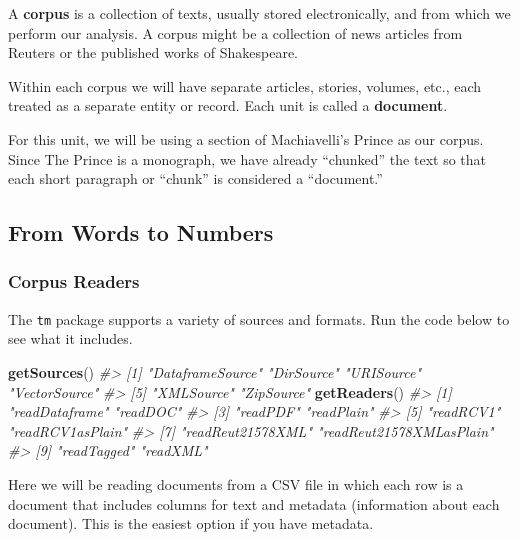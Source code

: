 \documentclass[
]{book}
\newenvironment{Shaded}{\begin{snugshade}}{\end{snugshade}}
\newcommand{\CommentTok}[1]{\textcolor[rgb]{0.56,0.35,0.01}{\textit{#1}}}
\newcommand{\KeywordTok}[1]{\textcolor[rgb]{0.13,0.29,0.53}{\textbf{#1}}}
\newcommand{\NormalTok}[1]{#1}
\begin{document}
A \textbf{corpus} is a collection of texts, usually stored electronically, and from which we perform our analysis. A corpus might be a collection of news articles from Reuters or the published works of Shakespeare.

Within each corpus we will have separate articles, stories, volumes, etc., each treated as a separate entity or record. Each unit is called a \textbf{document}.

For this unit, we will be using a section of Machiavelli's Prince as our corpus. Since The Prince is a monograph, we have already ``chunked'' the text so that each short paragraph or ``chunk'' is considered a ``document.''

\hypertarget{from-words-to-numbers}{%
\subsection{From Words to Numbers}\label{from-words-to-numbers}}

\hypertarget{corpus-readers}{%
\subsubsection*{Corpus Readers}\label{corpus-readers}}

The \texttt{tm} package supports a variety of sources and formats. Run the code below to see what it includes.

\begin{Shaded}
\begin{Highlighting}[]
\KeywordTok{getSources}\NormalTok{()}
\CommentTok{#> [1] "DataframeSource" "DirSource"       "URISource"       "VectorSource"   }
\CommentTok{#> [5] "XMLSource"       "ZipSource"}
\KeywordTok{getReaders}\NormalTok{()}
\CommentTok{#>  [1] "readDataframe"           "readDOC"                }
\CommentTok{#>  [3] "readPDF"                 "readPlain"              }
\CommentTok{#>  [5] "readRCV1"                "readRCV1asPlain"        }
\CommentTok{#>  [7] "readReut21578XML"        "readReut21578XMLasPlain"}
\CommentTok{#>  [9] "readTagged"              "readXML"}
\end{Highlighting}
\end{Shaded}

Here we will be reading documents from a CSV file in which each row is a document that includes columns for text and metadata (information about each document). This is the easiest option if you have metadata.
\end{document}
